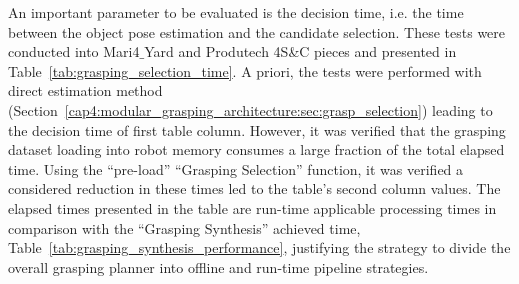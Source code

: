 \begin{table}[h!]
\end{table}

An important parameter to be evaluated is the decision time, i.e. the time between the object pose estimation and the candidate selection. These tests were conducted into Mari4$\_$Yard and Produtech 4S\&C pieces and presented in Table~\ref{tab:grasping_selection_time}. A priori, the tests were performed with direct estimation method (Section~\ref{cap4:modular_grasping_architecture:sec:grasp_selection}) leading to the decision time of first table column. However, it was verified that the grasping dataset loading into robot memory consumes a large fraction of the total elapsed time. Using the ``pre-load'' ``Grasping Selection'' function, it was verified a considered reduction in these times led to the table's second column values. The elapsed times presented in the table are run-time applicable processing times in comparison with the ``Grasping Synthesis'' achieved time, Table~\ref{tab:grasping_synthesis_performance}, justifying the strategy to divide the overall grasping planner into offline and run-time pipeline strategies.

